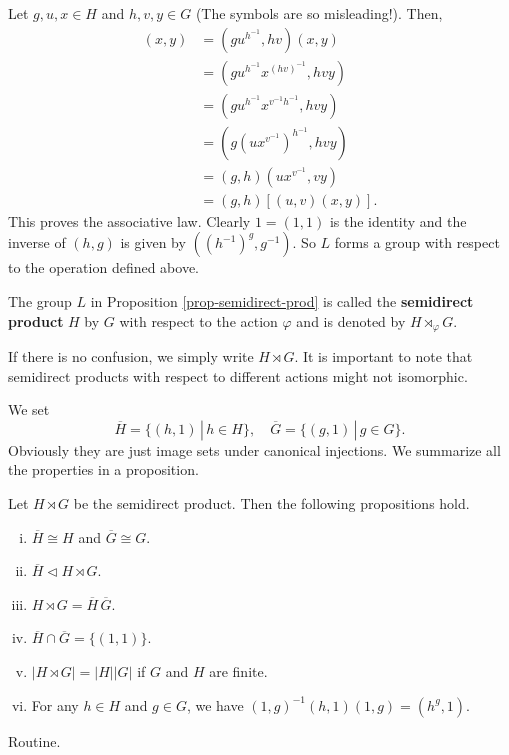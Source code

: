 \begin{sketch}
	Let $g, u, x \in H$ and $h, v, y \in G$ (The symbols are so misleading!). Then,
	\begin{align*}
		[(g, h)(u, v)](x, y) &= (gu^{h^{-1}},hv)(x, y) \\
		&= (gu^{h^{-1}}x^{(hv)^{-1}},hvy)
		\\
		&= (gu^{h^{-1}}x^{v^{-1}h^{-1}},hvy)
		\\
		&= (g(ux^{v^{-1}})^{h^{-1}},hvy)
		\\
		&= (g,h)(ux^{v^{-1}},vy)
		\\
		&=  (g, h)[(u, v)(x, y)].
	\end{align*}
	This proves the associative law. Clearly $1 = (1, 1)$ is the identity and the inverse of $(h, g)$ is given by $((h^{-1})^{g}, g^{-1})$. So $L$ forms a group with respect to the operation defined above.
\end{sketch}


\begin{definition}
	The group $L$ in Proposition \ref{prop-semidirect-prod} is called the \textbf{semidirect product} $H$ by $G$ with respect to the action $\varphi$ and is denoted by $H\rtimes_{\varphi} G$.
\end{definition}
 \begin{remark}
 	If there is no confusion, we simply write $H\rtimes G$. It is important to note that semidirect products with respect to different actions might not isomorphic. 
 \end{remark}
 We set
$$\overline{H} = \{(h,1) \,|\, h \in H\},\quad\overline{G} = \{(g,1)\,|\, g \in G\}.$$
Obviously they are just image sets under canonical injections.  We summarize all the properties in a proposition.
\begin{proposition} \label{prop-semidirect-prod-properties}
	Let $H \rtimes G$ be the semidirect product. Then the following propositions hold.
	\begin{enumerate}[(i)]
		\item $\overline{H} \cong H$ and $\overline{G}\cong G$.
		\item $\overline{H} \lhd  H \rtimes G$.
		\item $H \rtimes G= \overline{H}\,\overline{G}$.
		\item $\overline{H} \cap \overline{G} = \{(1,1)\}$.
		\item $|H \rtimes G| = |H|  |G|$ if $G$ and $H$ are finite.
		\item For any $h \in H$ and $g \in G$, we have $(1,g)^{-1}(h,1)(1,g) = (h^g,1)$.
	\end{enumerate}
\end{proposition} 
\begin{sketch}
	Routine.
\end{sketch}


